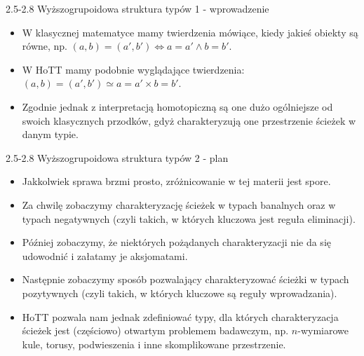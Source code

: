 \documentclass{beamer}
\begin{document}
\begin{frame}{2.5-2.8 Wyższogrupoidowa struktura typów 1 - wprowadzenie}
\begin{itemize}
	\item W klasycznej matematyce mamy twierdzenia mówiące, kiedy jakieś obiekty są równe, np. $(a, b) = (a', b') \iff a = a' \land b = b'$.
	\item W HoTT mamy podobnie wyglądające twierdzenia: $(a, b) = (a', b') \simeq a = a' \times b = b'$.
	\item Zgodnie jednak z interpretacją homotopiczną są one dużo ogólniejsze od swoich klasycznych przodków, gdyż charakteryzują one przestrzenie ścieżek w danym typie.
\end{itemize}
\end{frame}

\begin{frame}{2.5-2.8 Wyższogrupoidowa struktura typów 2 - plan}
\begin{itemize}
	\item Jakkolwiek sprawa brzmi prosto, zróżnicowanie w tej materii jest spore.
	\item Za chwilę zobaczymy charakteryzację ścieżek w typach banalnych oraz w typach negatywnych (czyli takich, w których kluczowa jest reguła eliminacji).
	\item Później zobaczymy, że niektórych pożądanych charakteryzacji nie da się udowodnić i załatamy je aksjomatami.
	\item Następnie zobaczymy sposób pozwalający charakteryzować ścieżki w typach pozytywnych (czyli takich, w których kluczowe są reguły wprowadzania).
	\item HoTT pozwala nam jednak zdefiniować typy, dla których charakteryzacja ścieżek jest (częściowo) otwartym problemem badawczym, np. $n$-wymiarowe kule, torusy, podwieszenia i inne skomplikowane przestrzenie.
\end{itemize}
\end{frame}
\end{document}
